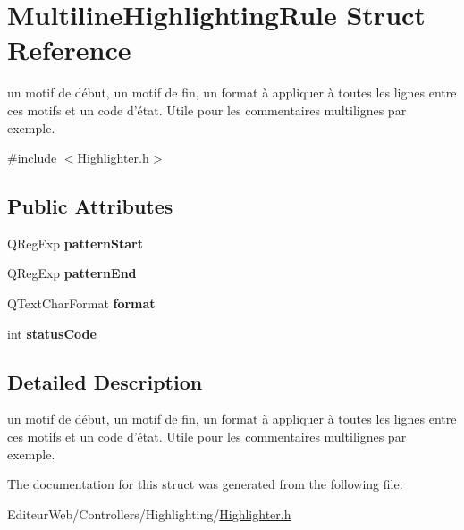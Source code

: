 \hypertarget{struct_multiline_highlighting_rule}{
\section{MultilineHighlightingRule Struct Reference}
\label{struct_multiline_highlighting_rule}
}


un motif de début, un motif de fin, un format à appliquer à toutes les lignes entre ces motifs et un code d'état. Utile pour les commentaires multilignes par exemple.  




{\ttfamily \#include $<$Highlighter.h$>$}

\subsection*{Public Attributes}
\begin{DoxyCompactItemize}
\item 
\hypertarget{struct_multiline_highlighting_rule_a96350fc8bb4c758b84d1be01551b6823}{
QRegExp {\bfseries patternStart}}
\label{struct_multiline_highlighting_rule_a96350fc8bb4c758b84d1be01551b6823}

\item 
\hypertarget{struct_multiline_highlighting_rule_adf031ba2c78ef00ee6c471a2c59e023e}{
QRegExp {\bfseries patternEnd}}
\label{struct_multiline_highlighting_rule_adf031ba2c78ef00ee6c471a2c59e023e}

\item 
\hypertarget{struct_multiline_highlighting_rule_ab6f91be7eeb75667fee9ef1ecedac22e}{
QTextCharFormat {\bfseries format}}
\label{struct_multiline_highlighting_rule_ab6f91be7eeb75667fee9ef1ecedac22e}

\item 
\hypertarget{struct_multiline_highlighting_rule_acebdcdac75429b5068d260afcb58477a}{
int {\bfseries statusCode}}
\label{struct_multiline_highlighting_rule_acebdcdac75429b5068d260afcb58477a}

\end{DoxyCompactItemize}


\subsection{Detailed Description}
un motif de début, un motif de fin, un format à appliquer à toutes les lignes entre ces motifs et un code d'état. Utile pour les commentaires multilignes par exemple. 

The documentation for this struct was generated from the following file:\begin{DoxyCompactItemize}
\item 
EditeurWeb/Controllers/Highlighting/\hyperlink{_highlighter_8h}{Highlighter.h}\end{DoxyCompactItemize}
